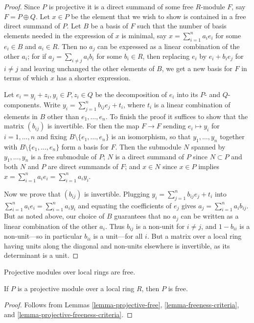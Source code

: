 \begin{proof}
Since $P$ is projective it is a direct summand of some free $R$-module $F$, say
$F = P \oplus Q$.  Let $x \in P$ be the element that we wish to show is
contained in a free direct summand of $P$.  Let $B$ be a basis of $F$ such that
the number of basis elements needed in the expression of $x$ is minimal, say $x
= \sum_{i=1}^n a_i e_i$ for some $e_i \in B$ and $a_i \in R$.  Then no $a_j$
can be expressed as a linear combination of the other $a_i$; for if $a_j =
\sum_{i \neq  j} a_i b_i$ for some $b_i \in R$, then replacing $e_i$ by $e_i +
b_ie_j$ for $i \neq j$ and leaving unchanged the other elements of $B$, we get
a new basis for $F$ in terms of which $x$ has a shorter expression.

\medskip\noindent
Let $e_i = y_i + z_i, y_i \in P, z_i \in Q$ be the decomposition of $e_i$ into
its $P$- and $Q$-components.  Write $y_i = \sum_{j=1}^{n} b_{ij} e_j + t_i$,
where $t_i$ is a linear combination of elements in $B$ other than $e_1, \ldots,
e_n$.  To finish the proof it suffices to show that the matrix $(b_{ij})$ is
invertible.  For then the map $F \to F$ sending $e_i \mapsto y_i$ for
$i=1, \ldots, n$ and fixing $B \setminus \{e_1, \ldots, e_n\}$ is an
isomorphism,
so that $y_1, \ldots, y_n$ together with $B \setminus \{e_1, \ldots, e_n\}$
form a basis for $F$.  Then the submodule $N$ spanned by $y_1, \ldots, y_n$
is a free submodule of $P$; $N$ is a direct summand of $P$ since $N \subset P$
and both $N$ and $P$ are direct summands of $F$; and $x \in N$ since $x \in P$
implies $x = \sum_{i=1}^n a_i e_i = \sum_{i=1}^n a_i y_i$.

\medskip\noindent
Now we prove that $(b_{ij})$ is invertible. Plugging $y_i = \sum_{j=1}^{n}
b_{ij} e_j + t_i$ into $\sum_{i=1}^n a_i e_i = \sum_{i=1}^n a_i y_i$ and
equating the coefficients of $e_j$ gives $a_j = \sum_{i=1}^n a_i b_{ij}$.  But
as noted above, our choice of $B$ guarantees that no $a_j$ can be written as a
linear combination of the other $a_i$.  Thus $b_{ij}$ is a non-unit for $i \neq
j$, and $1-b_{ii}$ is a non-unit---so in particular $b_{ii}$ is a unit---for
all $i$.  But a matrix over a local ring having units along the diagonal and
non-units elsewhere is invertible, as its determinant is a unit.
\end{proof}

\begin{theorem}
\label{theorem-projective-free-over-local-ring}
\begin{slogan}
Projective modules over local rings are free.
\end{slogan}
If $P$ is a projective module over a local ring $R$, then $P$ is free.
\end{theorem}

\begin{proof}
Follows from Lemmas \ref{lemma-projective-free}, \ref{lemma-freeness-criteria},
and \ref{lemma-projective-freeness-criteria}.
\end{proof}



